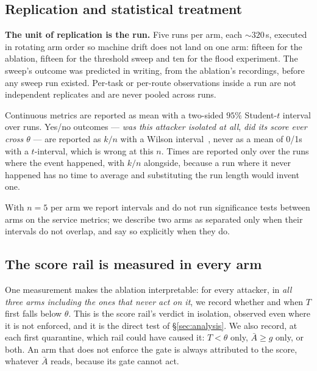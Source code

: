 \documentclass[10pt,twocolumn,letterpaper]{article}
\newcommand{\Tscore}{T}
\newcommand{\Agate}{\bar{A}}
\begin{document}
\subsection{Replication and statistical treatment}
\textbf{The unit of replication is the run.} Five runs per arm, each
${\sim}320$\,s, executed in rotating arm order so machine drift does not land on
one arm: fifteen for the ablation, fifteen for the threshold sweep and ten for
the flood experiment. The sweep's outcome was predicted in writing, from the
ablation's recordings, before any sweep run existed. Per-task or per-route observations inside a run
are not independent replicates and are never pooled across runs.

Continuous metrics are reported as mean with a two-sided $95\%$ Student-$t$
interval over runs. Yes/no outcomes --- \emph{was this attacker isolated at
all}, \emph{did its score ever cross $\theta$} --- are reported as $k/n$ with a
Wilson interval~\cite{wilson1927}, never as a mean of 0/1s with a
$t$-interval, which is wrong at this $n$. Times are reported only over the runs
where the event happened, with $k/n$ alongside, because a run where it never
happened has no time to average and substituting the run length would invent
one.

With $n = 5$ per arm we report intervals and do not run significance tests
between arms on the service metrics; we describe two arms as separated only
when their intervals do not overlap, and say so explicitly when they do.

\subsection{The score rail is measured in every arm}
One measurement makes the ablation interpretable: for every attacker, in
\emph{all three arms including the ones that never act on it}, we record
whether and when $\Tscore$ first falls below $\theta$. This is the score rail's
verdict in isolation, observed even where it is not enforced, and it is the
direct test of \S\ref{sec:analysis}. We also record, at each first quarantine,
which rail could have caused it: $\Tscore < \theta$ only, $\Agate \ge g$ only,
or both. An arm that does not enforce the gate is always attributed to the
score, whatever $\Agate$ reads, because its gate cannot act.
\end{document}
